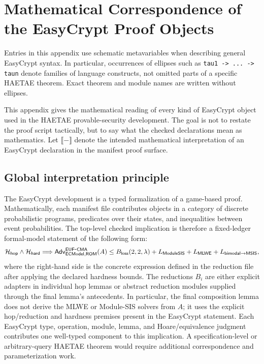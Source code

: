 \chapter{Mathematical Correspondence of the EasyCrypt Proof Objects}
\label{app:mathematical-correspondence}

\providecommand{\ecfile}[1]{\nolinkurl{#1}}
\providecommand{\ecsym}[1]{\nolinkurl{#1}}

Entries in this appendix use schematic metavariables when describing general
EasyCrypt syntax.  In particular, occurrences of ellipses such as
\ecsym{tau1 -> ... -> taun} denote families of language constructs, not omitted
parts of a specific HAETAE theorem.  Exact theorem and module names are written
without ellipses.

This appendix gives the mathematical reading of every kind of EasyCrypt object
used in the HAETAE provable-security development.  The goal is not to restate
the proof script tactically, but to say what the checked declarations mean as
mathematics.  Let \(\llbracket - \rrbracket\) denote the intended mathematical
interpretation of an EasyCrypt declaration in the manifest proof surface.

\section{Global interpretation principle}
\label{app:global-interpretation-principle}

The EasyCrypt development is a typed formalization of a game-based proof.
Mathematically, each manifest file contributes objects in a category of
discrete probabilistic programs, predicates over their states, and
inequalities between event probabilities.  The top-level checked implication is
therefore a fixed-ledger formal-model statement of the following form:
\[
  \mathcal{H}_{\mathsf{hop}}
  \wedge
  \mathcal{H}_{\mathsf{hard}}
  \Longrightarrow
  \mathsf{Adv}_{\mathsf{ECModel},\mathsf{ROM}}^{\mathsf{EUF}\mbox{-}\mathsf{CMA}}(A)
  \leq
  B_{\mathsf{loss}}(2,2,\lambda)
  + L_{\mathsf{ModuleSIS}}
  + L_{\mathsf{MLWE}}
  + L_{\mathsf{bimodal}\to\mathsf{MSIS}},
\]
where the right-hand side is the concrete expression defined in the reduction
file after applying the declared hardness bounds.  The reductions \(B_i\) are
either explicit adapters in individual hop lemmas or abstract reduction modules
supplied through the final lemma's antecedents.  In particular, the final
composition lemma does not derive the MLWE or Module-SIS solvers from \(A\); it
uses the explicit hop/reduction and hardness premises present in the EasyCrypt
statement.  Each EasyCrypt type, operation, module, lemma, and Hoare/equivalence
judgment contributes one well-typed component to this implication.  A
specification-level or arbitrary-query HAETAE theorem would require additional
correspondence and parameterization work.

